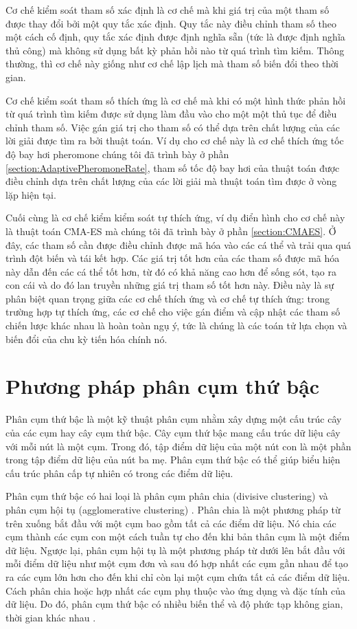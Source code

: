 Cơ chế kiểm soát tham số xác định là cơ chế mà khi giá trị của một tham số được thay đổi bởi một quy tắc xác định. Quy tắc này điều chỉnh tham số  theo một cách cố định, quy tắc xác định được định nghĩa sẵn (tức là được định nghĩa thủ công) mà không sử dụng bất kỳ phản hồi nào từ quá trình tìm kiếm. Thông thường, thì cơ chế này giống như cơ chế lập lịch mà tham số biến đổi theo thời gian.

Cơ chế kiểm soát tham số thích ứng là cơ chế mà khi có một hình thức phản hồi từ quá trình tìm kiếm được sử dụng làm đầu vào cho một một thủ tục để điều chỉnh tham số. Việc gán giá trị cho tham số  có thể dựa trên chất lượng của các lời giải được tìm ra bởi thuật toán. Ví dụ cho cơ chế này là cơ chế thích ứng tốc độ bay hơi pheromone chúng tôi đã trình bày ở phần \ref{section:AdaptivePheromoneRate}, tham số tốc độ bay hơi của thuật toán được điều chỉnh dựa trên chất lượng của các lời giải mà thuật toán tìm được ở vòng lặp hiện tại. 

Cuối cùng là cơ chế kiểm kiểm soát tự thích ứng, ví dụ điển hình cho cơ chế này là thuật toán CMA-ES mà chúng tôi đã trình bày ở phần \ref{section:CMAES}. Ở đây, các tham số cần được điều chỉnh được mã hóa vào các cá thể và trải qua quá trình đột biến và tái kết hợp. Các giá trị tốt hơn của các tham số được mã hóa này dẫn đến các cá thể tốt hơn, từ đó có khả năng cao hơn để sống sót, tạo ra con cái và do đó lan truyền những giá trị tham số tốt hơn này. Điều này là sự phân biệt quan trọng giữa các cơ chế thích ứng và cơ chế tự thích ứng: trong trường hợp tự thích ứng, các cơ chế cho việc gán điểm và cập nhật các tham số chiến lược khác nhau là hoàn toàn ngụ ý, tức là chúng là các toán tử lựa chọn và biến đổi của chu kỳ tiến hóa chính nó.

\section{Phương pháp phân cụm thứ bậc}\label{section:bgClusterTree}

Phân cụm thứ bậc là một kỹ thuật phân cụm nhằm xây dựng một cấu trúc cây của các cụm hay cây cụm thứ bậc. Cây cụm thứ bậc mang cấu trúc dữ liệu cây với mỗi nút là một cụm. Trong đó, tập điểm dữ liệu của một nút con là một phần trong tập điểm dữ liệu của nút ba mẹ. Phân cụm thứ bậc có thể giúp biểu hiện cấu trúc phân cấp tự nhiên có trong các điểm dữ liệu.

Phân cụm thứ bậc có hai loại là phân cụm phân chia (divisive clustering) và phân cụm hội tụ (agglomerative clustering) \cite{shetty2021hierarchical}. Phân chia là một phương pháp từ trên xuống bắt đầu với một cụm bao gồm tất cả các điểm dữ liệu. Nó chia các cụm thành các cụm con một cách tuần tự cho đến khi bản thân cụm là một điểm dữ liệu. Ngược lại, phân cụm hội tụ là một phương pháp từ dưới lên bắt đầu với mỗi điểm dữ liệu như một cụm đơn và sau đó hợp nhất các cụm gần nhau để tạo ra các cụm lớn hơn cho đến khi chỉ còn lại một cụm chứa tất cả các điểm dữ liệu. Cách phân chia hoặc hợp nhất các cụm phụ thuộc vào ứng dụng và đặc tính của dữ liệu. Do đó, phân cụm thứ bậc có nhiều biến thể và độ phức tạp không gian, thời gian khác nhau \cite{murtagh2012algorithms, murtagh2017algorithms}.
